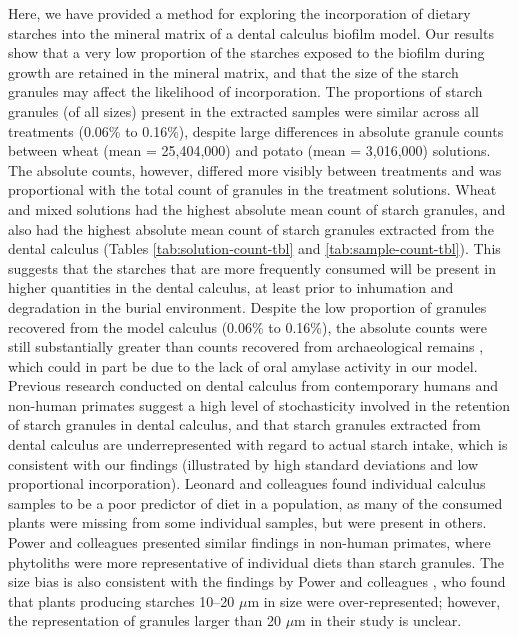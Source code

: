 \documentclass[utf8]{../templates/frontiersSCNS}
\begin{document}
Here, we have provided a method for exploring the incorporation of dietary
starches into the mineral matrix of a dental calculus biofilm model. Our results show
that a very low proportion of the starches exposed to the biofilm during growth are
retained in the mineral matrix, and that the size of the starch granules
may affect the likelihood of incorporation. The proportions of starch granules
(of all sizes) present in the extracted samples were similar across all treatments
(0.06\% to 0.16\%),
despite large differences in absolute granule counts between wheat
(mean = 25,404,000)
and potato
(mean = 3,016,000)
solutions.\\
The absolute counts, however, differed more visibly between treatments and was
proportional with the total count of granules in the treatment solutions. Wheat
and mixed solutions had the highest absolute mean count of starch granules, and
also had the highest absolute mean count of starch granules extracted from the
dental calculus
(Tables \ref{tab:solution-count-tbl} and \ref{tab:sample-count-tbl}).
This suggests that the starches that are more frequently consumed will be present
in higher quantities in the dental calculus, at least prior to inhumation and
degradation in the burial environment.
Despite the low proportion of granules recovered from the model calculus
(0.06\% to 0.16\%),
the absolute counts were still substantially greater than counts recovered from
archaeological remains
\citep{trompDietaryNondietary2015, trompEDTACalculus2017, wesolowskiEvaluatingMicrofossil2010}, which could in part be due to the
lack of oral amylase activity in our model.
Previous research conducted on dental calculus from contemporary humans and non-human
primates suggest a high level of stochasticity involved in the retention of
starch granules in dental calculus, and that starch granules extracted from dental
calculus are underrepresented with regard
to actual starch intake, which is consistent with our findings (illustrated by high
standard deviations and low proportional incorporation).
Leonard and colleagues \citeyearpar{leonardPlantMicroremains2015} found individual
calculus samples to be a poor predictor of diet in a population, as many of the
consumed plants were missing from some individual samples, but were present in others.\\
Power and colleagues \citeyearpar{powerChimpCalculus2015}
presented similar findings in non-human primates, where phytoliths were more
representative of individual diets than starch granules.
The size bias is also consistent with the findings by Power and colleagues
\citeyearpar{powerChimpCalculus2015},
who found that plants producing starches 10--20 \(\mu\)m in
size were over-represented; however, the representation of granules larger than
20 \(\mu\)m in their study is unclear.
\end{document}
